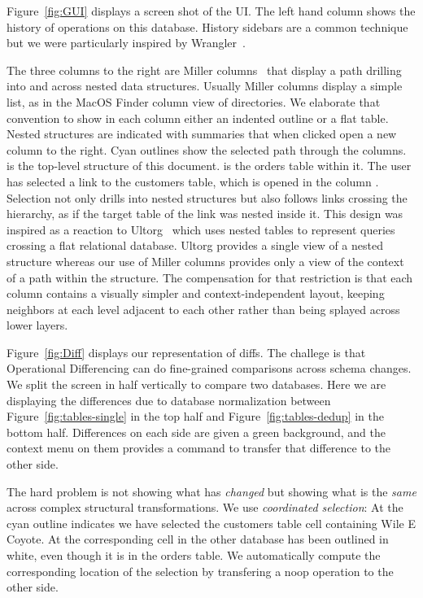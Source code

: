 \documentclass[english,submission]{programming}
\theoremstyle{definition}
\begin{document}
Figure~\ref{fig:GUI} displays a screen shot of the UI.  The left hand column shows the history of operations on this database. History sidebars are a common technique but we were particularly inspired by Wrangler~\cite{kandel11}.

The three columns to the right are Miller columns~\cite{miller-columns} that display a path drilling into and across nested data structures. Usually Miller columns display a simple list, as in the MacOS Finder column view of directories. We elaborate that convention to show in each column either an indented outline or a flat table. Nested structures are indicated with summaries that when clicked open a new column to the right. Cyan outlines show the selected path through the columns.  is the top-level structure of this document.  is the \textsf{orders} table within it. The user has selected a link to the \textsf{customers} table, which is opened in the column . Selection not only drills into nested structures but also follows links crossing the hierarchy, as if the target table of the link was nested inside it. This design was inspired as a reaction to Ultorg~\cite{bakke:phdthesis, ultorg} which uses nested tables to represent queries crossing a flat relational database. Ultorg provides a single view of a nested structure whereas our use of Miller columns provides only a view of the context of a path within the structure. The compensation for that restriction is that each column contains a visually simpler and context-independent layout, keeping neighbors at each level adjacent to each other rather than being splayed across lower layers.

Figure~\ref{fig:Diff} displays our representation of diffs. The challege is that Operational Differencing can do fine-grained comparisons across schema changes. We split the screen in half vertically to compare two databases. Here we are displaying the differences due to database normalization between Figure~\ref{fig:tables-single} in the top half and Figure~\ref{fig:tables-dedup} in the bottom half. Differences on each side are given a green background, and the context menu on them provides a command to transfer that difference to the other side.

The hard problem is not showing what has \textit{changed} but showing what is the \textit{same} across complex structural transformations.
We use \textit{coordinated selection}:  At  the cyan outline indicates we have selected the \textsf{customers} table cell containing \textsf{Wile E Coyote}. At  the corresponding cell in the other database has been outlined in white, even though it is in the \textsf{orders} table. We automatically compute the corresponding location of the selection by transfering a \textsf{noop} operation to the other side.
\end{document}
